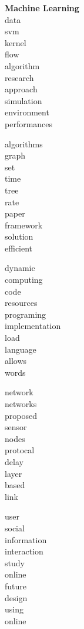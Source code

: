 \begin{minipage}{.196\textwidth}
\centering
\textbf{Machine Learning} \\
data \\
svm \\
kernel \\
flow \\
algorithm \\
research \\
approach \\
simulation \\
environment \\
performances
\end{minipage}

\begin{minipage}{.196\textwidth}
\centering
algorithms \\
graph \\
set \\
time \\
tree \\
rate \\
paper \\
framework \\
solution \\
efficient
\end{minipage}
\begin{minipage}{.196\textwidth}
\centering
dynamic \\
computing \\
code \\
resources \\
programing \\
implementation \\
load \\
language \\
allows \\
words
\end{minipage}
\begin{minipage}{.196\textwidth}
\centering
network \\
networks \\
proposed \\
sensor \\
nodes \\
protocal \\
delay \\
layer \\
based \\
link
\end{minipage}
\begin{minipage}{.196\textwidth}
\centering
user \\
social \\
information \\
interaction \\
study \\
online \\
future \\
design \\
using \\
online
\end{minipage}
